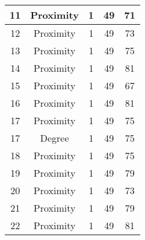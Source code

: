 \documentclass[results.tex]{subfiles}
\begin{document}
\begin{center}
\begin{tabular}{| c || c | c | c | c |}
            \hline
            11                      & Proximity                    & 1                      & 49                      & 71                   \\
            \hline
            12                      & Proximity                    & 1                      & 49                      & 73                   \\
            \hline
            13                      & Proximity                    & 1                      & 49                      & 75                   \\
            \hline
            14                      & Proximity                    & 1                      & 49                      & 81                   \\
            \hline
            15                      & Proximity                    & 1                      & 49                      & 67                   \\
            \hline
            16                      & Proximity                    & 1                      & 49                      & 81                   \\
            \hline
            17                      & Proximity                    & 1                      & 49                      & 75                   \\
            \hline
            17                      & Degree                       & 1                      & 49                      & 75                   \\
            \hline
            18                      & Proximity                    & 1                      & 49                      & 75                   \\
            \hline
            19                      & Proximity                    & 1                      & 49                      & 79                   \\
            \hline
            20                      & Proximity                    & 1                      & 49                      & 73                   \\
            \hline
            21                      & Proximity                    & 1                      & 49                      & 79                   \\
            \hline
            22                      & Proximity                    & 1                      & 49                      & 81                   \\

\end{tabular}
\end{center}
\end{document}
